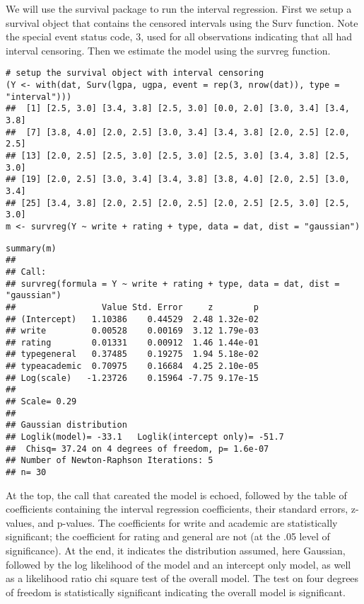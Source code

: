 We will use the survival package to run the interval regression. First we setup a survival object that contains the censored intervals using the Surv function. Note the special event status code, 3, used for all observations indicating that all had interval censoring. Then we estimate the model using the survreg function.
\begin{framed}
\begin{verbatim}
# setup the survival object with interval censoring
(Y <- with(dat, Surv(lgpa, ugpa, event = rep(3, nrow(dat)), type = "interval")))
##  [1] [2.5, 3.0] [3.4, 3.8] [2.5, 3.0] [0.0, 2.0] [3.0, 3.4] [3.4, 3.8]
##  [7] [3.8, 4.0] [2.0, 2.5] [3.0, 3.4] [3.4, 3.8] [2.0, 2.5] [2.0, 2.5]
## [13] [2.0, 2.5] [2.5, 3.0] [2.5, 3.0] [2.5, 3.0] [3.4, 3.8] [2.5, 3.0]
## [19] [2.0, 2.5] [3.0, 3.4] [3.4, 3.8] [3.8, 4.0] [2.0, 2.5] [3.0, 3.4]
## [25] [3.4, 3.8] [2.0, 2.5] [2.0, 2.5] [2.0, 2.5] [2.5, 3.0] [2.5, 3.0]
m <- survreg(Y ~ write + rating + type, data = dat, dist = "gaussian")
\end{verbatim}
\end{framed}
\begin{framed}
\begin{verbatim}summary(m)
## 
## Call:
## survreg(formula = Y ~ write + rating + type, data = dat, dist = "gaussian")
##                 Value Std. Error     z        p
## (Intercept)   1.10386    0.44529  2.48 1.32e-02
## write         0.00528    0.00169  3.12 1.79e-03
## rating        0.01331    0.00912  1.46 1.44e-01
## typegeneral   0.37485    0.19275  1.94 5.18e-02
## typeacademic  0.70975    0.16684  4.25 2.10e-05
## Log(scale)   -1.23726    0.15964 -7.75 9.17e-15
## 
## Scale= 0.29 
## 
## Gaussian distribution
## Loglik(model)= -33.1   Loglik(intercept only)= -51.7
## 	Chisq= 37.24 on 4 degrees of freedom, p= 1.6e-07 
## Number of Newton-Raphson Iterations: 5 
## n= 30
\end{verbatim}
\end{framed}
At the top, the call that careated the model is echoed, followed by the table of coefficients containing the interval regression coefficients, their standard errors, z-values, and p-values. The coefficients for write and academic are statistically significant; the coefficient for rating and general are not (at the .05 level of significance).
At the end, it indicates the distribution assumed, here Gaussian, followed by the log likelihood of the model and an intercept only model, as well as a likelihood ratio chi square test of the overall model. The test on four degrees of freedom is statistically significant indicating the overall model is significant.
